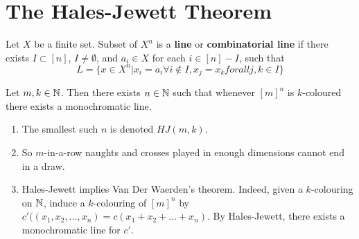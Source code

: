 \chapter{The Hales-Jewett Theorem}
\label{cha:hales-jewett-theorem}

Let $X$ be a finite set.  Subset of $X^{n}$ is a \textbf{line} or
\textbf{combinatorial line} if there exists $I \subset [n]$, $I \neq
\emptyset$, and $a_{i} \in X$ for each $i \in [n] - I$, such that
\begin{equation}
  \label{eq:3}
  L = \{ x \in X^{n} | x_{i} = a_{i} \forall i \notin I, x_{j} = x_{k}
  forall j, k \in I \}
\end{equation}

\begin{thm}
  \label{defn:hales_jewett_theorem:1}
  Let $m, k \in \mathbb{N}$.  Then there exists $n \in \mathbb{N}$ such that whenever
  $[m]^{n}$ is $k$-coloured there exists a monochromatic line.
\end{thm}

\begin{remark}
  \begin{enumerate}
  \item The smallest such $n$ is denoted $HJ(m, k)$.
  \item So $m$-in-a-row naughts and crosses played in enough
    dimensions cannot end in a draw.
  \item Hales-Jewett implies Van Der Waerden's theorem.
    Indeed, given a $k$-colouring on $\mathbb{N}$, induce a $k$-colouring of
    $[m]^{n}$ by $c'((x_{1}, x_{2}, \dots, x_{n}) = c(x_{1} + x_{2} +
    \dots + x_{n})$. By Hales-Jewett, there exists a monochromatic line
    for $c'$.
  \end{enumerate}
\end{remark}



